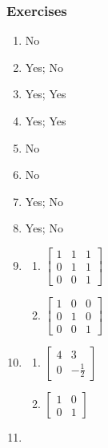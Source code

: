 \documentclass{article}
\begin{document}
\subsubsection*{Exercises}
\begin{enumerate}
  \item No
  \item Yes; No
  \item Yes; Yes
  \item Yes; Yes
  \item No
  \item No
  \item Yes; No
  \item Yes; No
  \item
    \begin{enumerate}
      \item
        $
        \begin{bmatrix}
          1 & 1 & 1 \\
          0 & 1 & 1 \\
          0 & 0 & 1
        \end{bmatrix}
        $
      \item
        $
        \begin{bmatrix}
          1 & 0 & 0 \\
          0 & 1 & 0 \\
          0 & 0 & 1
        \end{bmatrix}
        $
    \end{enumerate}
  \item
    \begin{enumerate}
      \item
        $
        \begin{bmatrix}
          4 & 3 \\
          0 & -\frac{1}{2}
        \end{bmatrix}
        $
      \item
        $
        \begin{bmatrix}
          1 & 0 \\
          0 & 1
        \end{bmatrix}
        $
    \end{enumerate}
  \item
\end{enumerate}
\end{document}
